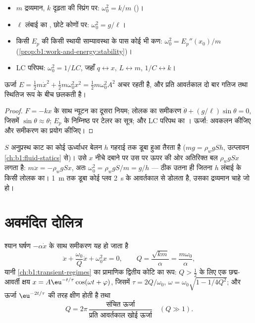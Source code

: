 \begin{proposition}[आवर्त दोलित्र कहाँ-कहाँ से आते हैं]\label{prop:b1:oscillators-resonance:sources}
\begin{itemize}
  \item $m$ द्रव्यमान, $k$ दृढ़ता की स्प्रिंग पर: $\omega_0^2 = k/m$ ()।
  \item $\ell$ लंबाई का , छोटे कोणों पर: $\omega_0^2 = g/\ell$।
  \item किसी  $E_p$ की किसी स्थायी साम्यावस्था के पास कोई भी
        कण: $\omega_0^2 = E_p''(x_0)/m$ (\cref{prop:b1:work-and-energy:stability})।
  \item LC परिपथ: $\omega_0^2 = 1/LC$, जहाँ $q \leftrightarrow x$,
        $L \leftrightarrow m$, $1/C \leftrightarrow k$।
\end{itemize}
ऊर्जा $E = \tfrac12 m\dot x^2 + \tfrac12 m\omega_0^2x^2 = \tfrac12
m\omega_0^2A^2$ अचर रहती है, और प्रति आवर्तकाल दो बार गतिज तथा स्थितिज रूप
के बीच छलकती है।
\end{proposition}

\begin{proof}
$F = -kx$ के साथ न्यूटन का दूसरा नियम; लोलक का समीकरण
$\ddot\theta + (g/\ell)\sin\theta = 0$, जिसमें $\sin\theta \approx \theta$;
$E_p$ के निम्निष्ठ पर टेलर का सूत्र; और LC परिपथ का । ऊर्जा:
अवकलन कीजिए और समीकरण का प्रयोग कीजिए।
\end{proof}

\begin{example}[डोलता बेलन]\label{ex:b1:oscillators-resonance:bob}
$S$ अनुप्रस्थ काट का कोई ऊर्ध्वाधर बेलन $h$ गहराई तक डूबा हुआ तैरता है
($mg = \rho_wgSh$, उत्प्लावन \cref{ch:b1:fluid-statics} से)। उसे $x$ नीचे
दबाने पर उस पर ऊपर की ओर अतिरिक्त बल $\rho_wgSx$ लगता है:
$m\ddot x = -\rho_wgSx$, अतः $\omega_0^2 = \rho_wgS/m = g/h$ --- ठीक उतना ही
जितना $h$ लंबाई के किसी लोलक का। \qty{1}{m} तक डूबा कोई प्लव \qty{2}{s} के
आवर्तकाल से डोलता है, उसका द्रव्यमान चाहे जो हो।
\end{example}

\section{अवमंदित दोलित्र}

\begin{proposition}[अवमंदित दोलित्र]\label{prop:b1:oscillators-resonance:damped}
श्यान घर्षण $-\alpha\dot x$ के साथ समीकरण यह हो जाता है
\[
\ddot x + \frac{\omega_0}{Q}\dot x + \omega_0^2x = 0, \qquad
Q = \frac{\sqrt{km}}{\alpha} = \frac{m\omega_0}{\alpha},
\]
यानी \cref{ch:b1:transient-regimes} का प्रामाणिक द्वितीय कोटि का रूप:
$Q > \tfrac12$ के लिए एक छद्म-आवर्ती क्षय $x = A\eu^{-t/\tau}\cos(\omega t +
\varphi)$, जिसमें $\tau = 2Q/\omega_0$, $\omega = \omega_0\sqrt{1 - 1/4Q^2}$; और
ऊर्जा $\eu^{-2t/\tau}$ की तरह क्षीण होती है तथा
\[
Q = 2\pi\,\frac{\text{संचित ऊर्जा}}{\text{प्रति आवर्तकाल खोई ऊर्जा}}
\quad (Q \gg 1) .
\]
\end{proposition}

